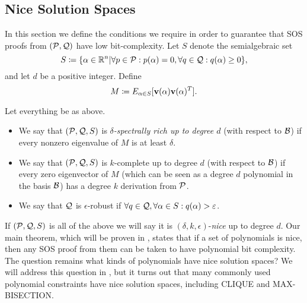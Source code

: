 \subsection{Nice Solution Spaces}
In this section we define the conditions we require in order to guarantee that SOS proofs from $(\mathcal P, \mathcal Q)$ have low bit-complexity. Let $S$ denote the semialgebraic set
\[S \coloneqq \{\alpha \in \mathbb R^n | \forall p \in \mathcal P: p(\alpha) = 0, \forall q \in \mathcal Q: q(\alpha) \geq 0\},\]
and let $d$ be a positive integer. Define
\[M \coloneqq E_{\alpha \in S}[{\bf v}(\alpha){\bf v}(\alpha)^T].\]
\begin{definition}
Let everything be as above.
\begin{itemize}
\item We say that $(\mathcal P, \mathcal Q, S)$ is \emph{$\delta$-spectrally rich up to degree $d$} (with respect to $\mathcal B$) if every nonzero eigenvalue of $M$ is at least $\delta$.
\item We say that $(\mathcal P, \mathcal Q, S)$ is $k$-complete up to degree $d$ (with respect to $\mathcal B$) if every zero eigenvector of $M$ (which can be seen as a degree $d$ polynomial in the basis $\mathcal B$) has a degree $k$ derivation from $\mathcal P$. 
\item We say that $\mathcal Q$ is $\epsilon$-robust if $\forall q \in \mathcal Q, \forall \alpha \in S: q(\alpha) > \varepsilon$.
\end{itemize}
\end{definition}
If $(\mathcal P, \mathcal Q, S)$ is all of the above we will say it is $(\delta, k, \epsilon)$-\emph{nice} up to degree $d$. Our main theorem, which will be proven in , states that if a set of polynomials is nice, then any SOS proof from them can be taken to have polynomial bit complexity. The question remains what kinds of polynomials have nice solution spaces? We will address this question in , but it turns out that many commonly used polynomial constraints have nice solution spaces, including CLIQUE and MAX-BISECTION.

